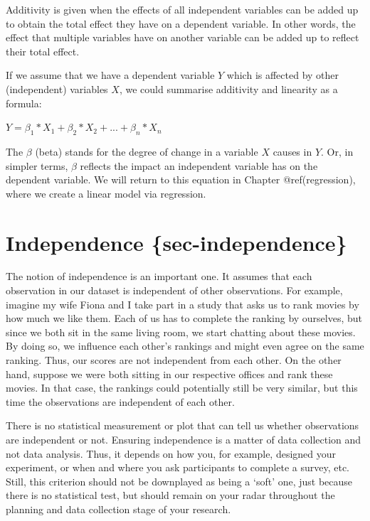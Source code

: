 \documentclass[
  letterpaper,
]{krantz}
\begin{document}
Additivity is given when the effects of all independent variables can be
added up to obtain the total effect they have on a dependent variable.
In other words, the effect that multiple variables have on another
variable can be added up to reflect their total effect.

If we assume that we have a dependent variable \(Y\) which is affected
by other (independent) variables \(X\), we could summarise additivity
and linearity as a formula:

\label{linearity_additivity-formula}
\(Y = \beta_{1} * X_1 + \beta_{2} * X_{2} + ... + \beta_{n} * X_{n}\)

The \(\beta\) (beta) stands for the degree of change in a variable \(X\)
causes in \(Y\). Or, in simpler terms, \(\beta\) reflects the impact an
independent variable has on the dependent variable. We will return to
this equation in Chapter @ref(regression), where we create a linear
model via regression.

\section{Independence
\{sec-independence\}}\label{independence-sec-independence}

The notion of independence is an important one. It assumes that each
observation in our dataset is independent of other observations. For
example, imagine my wife Fiona and I take part in a study that asks us
to rank movies by how much we like them. Each of us has to complete the
ranking by ourselves, but since we both sit in the same living room, we
start chatting about these movies. By doing so, we influence each
other's rankings and might even agree on the same ranking. Thus, our
scores are not independent from each other. On the other hand, suppose
we were both sitting in our respective offices and rank these movies. In
that case, the rankings could potentially still be very similar, but
this time the observations are independent of each other.

There is no statistical measurement or plot that can tell us whether
observations are independent or not. Ensuring independence is a matter
of data collection and not data analysis. Thus, it depends on how you,
for example, designed your experiment, or when and where you ask
participants to complete a survey, etc. Still, this criterion should not
be downplayed as being a `soft' one, just because there is no
statistical test, but should remain on your radar throughout the
planning and data collection stage of your research.
\end{document}
